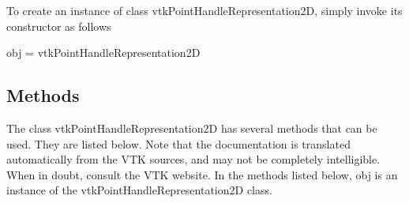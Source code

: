 To create an instance of class vtk\-Point\-Handle\-Representation2\-D, simply invoke its constructor as follows \begin{DoxyVerb}  obj = vtkPointHandleRepresentation2D
\end{DoxyVerb}
 \hypertarget{vtkwidgets_vtkxyplotwidget_Methods}{}\subsection{Methods}\label{vtkwidgets_vtkxyplotwidget_Methods}
The class vtk\-Point\-Handle\-Representation2\-D has several methods that can be used. They are listed below. Note that the documentation is translated automatically from the V\-T\-K sources, and may not be completely intelligible. When in doubt, consult the V\-T\-K website. In the methods listed below, {\ttfamily obj} is an instance of the vtk\-Point\-Handle\-Representation2\-D class. 

